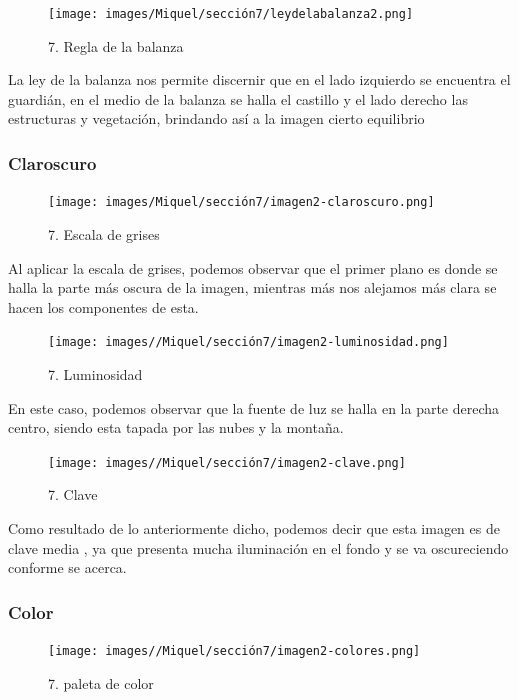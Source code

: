 \documentclass[12pt]{article}
\begin{document}
    \begin{figure}[H]
      \centering
      \texttt{[image: images/Miquel/sección7/leydelabalanza2.png]}
      \caption{\small 7. Regla de la balanza}
    \end{figure}

    La ley de la balanza nos permite discernir que en el lado izquierdo se encuentra el guardián, en el medio de la balanza se halla el castillo y el lado derecho las estructuras y vegetación, brindando así a la imagen cierto equilibrio
   
        \subsubsection{Claroscuro}

    \begin{figure}[H]
      \centering
      \texttt{[image: images/Miquel/sección7/imagen2-claroscuro.png]}
      \caption{\small 7. Escala de grises}
    \end{figure}
    
    Al aplicar la escala de grises, podemos observar que el primer plano es donde se halla la parte más oscura de la imagen, mientras más nos alejamos más clara se hacen los componentes de esta.

    \begin{figure}[H]
      \centering
      \texttt{[image: images//Miquel/sección7/imagen2-luminosidad.png]}
      \caption{\small 7. Luminosidad}
    \end{figure}

    En este caso, podemos observar que la fuente de luz se halla en la parte derecha centro, siendo esta tapada por las nubes y la montaña.
    
    \begin{figure}[H]
      \centering
      \texttt{[image: images//Miquel/sección7/imagen2-clave.png]}
      \caption{\small 7. Clave}
    \end{figure}

    Como resultado de lo anteriormente dicho, podemos decir que esta imagen es de clave media , ya que presenta mucha iluminación en el fondo y se va oscureciendo conforme se acerca.

        \subsubsection{Color}
\begin{figure}[H]
      \centering
      \texttt{[image: images//Miquel/sección7/imagen2-colores.png]}
      \caption{\small 7. paleta de color}
    \end{figure}
\end{document}
